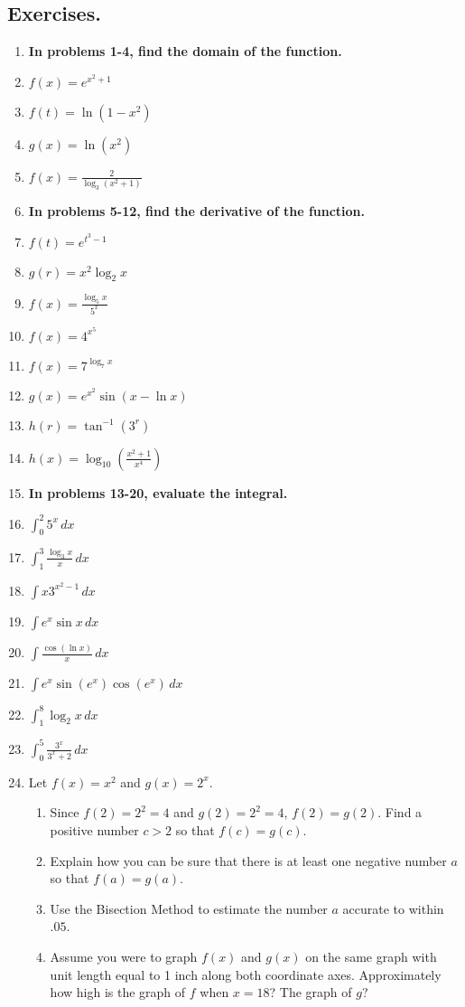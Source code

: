 \subsection{Exercises.}

\begin{enumerate}
\item[] {\bfseries In problems 1-4, find the domain of the function.}
\item $f(x)=e^{x^2+1}$
\item $f(t)=\ln(1-x^2)$
\item $g(x)=\ln(x^2)$
\item $f(x)=\frac{2}{\log_3(x^2+1)}$
\item[] {\bfseries In problems 5-12, find the derivative of the function.}
\item $f(t)=e^{t^3-1}$
\item $g(r)=x^2\log_2 x$
\item $\displaystyle f(x)=\frac{\log_5x}{5^x}$
\item $f(x)=4^{x^5}$
\item $f(x)=7^{\log_7 x}$
\item $g(x)=e^{x^2}\sin(x-\ln x)$
\item $h(r)=\tan^{-1}(3^r)$
\item $\displaystyle h(x)=\log_{10}\left(\frac{x^2+1}{x^4}\right)$
\item[] {\bfseries In problems 13-20, evaluate the integral.}
\item $\displaystyle \int_0^2 5^x\,dx$
\item $\displaystyle \int_1^3 \frac{\log_3x}{x}\,dx$
\item $\displaystyle \int x3^{x^2-1}\,dx$
\item $\displaystyle \int e^x\sin x\,dx$
\item $\displaystyle \int \frac{\cos(\ln x)}{x}\,dx$
\item $\displaystyle \int e^x\sin(e^x)\cos(e^x)\,dx$
\item $\displaystyle \int_1^8 \log_2x\,dx$
\item $\displaystyle \int_0^5 \frac{3^x}{3^x+2}\,dx$
\item Let $f(x)=x^2$ and $g(x)=2^x$.
\begin{enumerate}
\item Since $f(2)=2^2=4$ and $g(2)=2^2=4$, $f(2)=g(2)$. Find a positive number $c>2$ so that $f(c)=g(c)$.
\item Explain how you can be sure that there is at least one negative number $a$ so that $f(a)=g(a)$.
\item Use the Bisection Method to estimate the number $a$ accurate to within $.05$.
\item Assume you were to graph $f(x)$ and $g(x)$ on the same graph with unit length equal to 1 inch along both coordinate axes. Approximately how high is the graph of $f$ when $x=18$? The graph of $g$?
\end{enumerate}
\end{enumerate}

